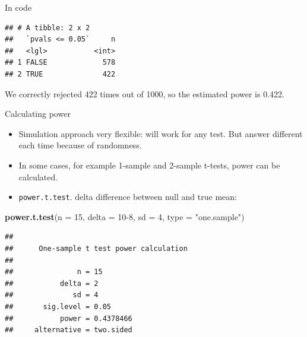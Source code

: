 \documentclass[ignorenonframetext,]{beamer}
\newenvironment{Shaded}{\begin{snugshade}}{\end{snugshade}}
\newcommand{\DataTypeTok}[1]{\textcolor[rgb]{0.13,0.29,0.53}{#1}}
\newcommand{\DecValTok}[1]{\textcolor[rgb]{0.00,0.00,0.81}{#1}}
\newcommand{\FloatTok}[1]{\textcolor[rgb]{0.00,0.00,0.81}{#1}}
\newcommand{\KeywordTok}[1]{\textcolor[rgb]{0.13,0.29,0.53}{\textbf{#1}}}
\newcommand{\NormalTok}[1]{#1}
\newcommand{\OperatorTok}[1]{\textcolor[rgb]{0.81,0.36,0.00}{\textbf{#1}}}
\newcommand{\StringTok}[1]{\textcolor[rgb]{0.31,0.60,0.02}{#1}}
\providecommand{\tightlist}{%
  \setlength{\itemsep}{0pt}\setlength{\parskip}{0pt}}
\begin{document}
\begin{frame}[fragile]{In code}
\protect\hypertarget{in-code}{}

\begin{Shaded}
\end{Shaded}

\begin{verbatim}
## # A tibble: 2 x 2
##   `pvals <= 0.05`     n
##   <lgl>           <int>
## 1 FALSE             578
## 2 TRUE              422
\end{verbatim}

We correctly rejected 422 times out of 1000, so the estimated power is
0.422.

\end{frame}

\begin{frame}[fragile]{Calculating power}
\protect\hypertarget{calculating-power}{}

\begin{itemize}
\tightlist
\item
  Simulation approach very flexible: will work for any test. But answer
  different each time because of randomness.
\item
  In some cases, for example 1-sample and 2-sample t-tests, power can be
  calculated.
\item
  \texttt{power.t.test}. delta difference between null and true mean:
\end{itemize}

\small

\begin{Shaded}
\begin{Highlighting}[]
\KeywordTok{power.t.test}\NormalTok{(}\DataTypeTok{n =} \DecValTok{15}\NormalTok{, }\DataTypeTok{delta =} \DecValTok{10-8}\NormalTok{, }\DataTypeTok{sd =} \DecValTok{4}\NormalTok{, }\DataTypeTok{type =} \StringTok{"one.sample"}\NormalTok{)}
\end{Highlighting}
\end{Shaded}

\begin{verbatim}
## 
##      One-sample t test power calculation 
## 
##               n = 15
##           delta = 2
##              sd = 4
##       sig.level = 0.05
##           power = 0.4378466
##     alternative = two.sided
\end{verbatim}

\normalsize

\end{frame}
\end{document}

